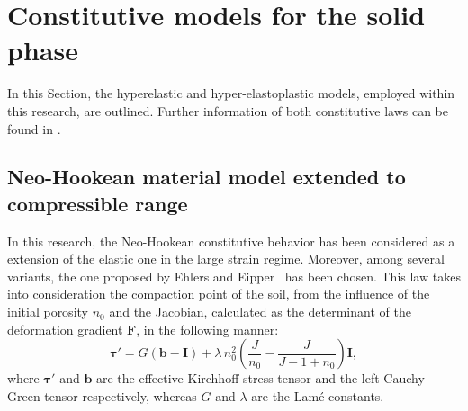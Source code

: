 \documentclass[twocolumn]{svjour3}          %
\begin{document}
\section{Constitutive models for the solid phase} \label{sec:3}
In this Section, the hyperelastic and hyper-elastoplastic models, employed within this research, are outlined. Further information of both constitutive laws can be found in \cite{Navas2018,Navas:17b,Navas:17c}.
\subsection{Neo-Hookean material model extended to compressible range} \label{subsec:31}

In this research, the Neo-Hookean constitutive behavior has been considered as a extension of the elastic one in the large strain regime. Moreover, among several variants, the one proposed by Ehlers and Eipper~\cite{Ehlers:99} has been chosen. This law takes into consideration the compaction point of the soil, from the influence of  the initial porosity  $n_0$ and the Jacobian, calculated as the determinant of the deformation gradient $\boldsymbol{F}$, in the following manner:
\begin{equation}\label{eq_nh2}
\boldsymbol{\tau}'=G(\boldsymbol{b}-\textbf{I})+\lambda \, n_0^2\left(  \frac{J}{n_0}-\frac{J}{J-1+n_0} \right)\textbf{I},
\end{equation}
where $\boldsymbol{\tau}'$ and  $\boldsymbol{b}$ are the effective Kirchhoff stress tensor and the left Cauchy-Green tensor respectively, whereas $G$ and $\lambda$ are the Lam\'e constants.  
\end{document}
